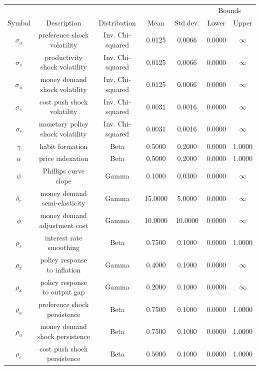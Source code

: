 \documentclass[11pt,preprint, authoryear]{elsarticle}
\let\origtable\table
\let\endorigtable\endtable
\renewenvironment{table}[1][2] {
    \expandafter\origtable\expandafter[H]
} {
    \endorigtable
}
\numberwithin{equation}{section}
\numberwithin{figure}{section}
\numberwithin{table}{section}
\begin{document}
\begin{table}
\caption{Prior information (parameters)}
 \label{Table:Prior}
 \begin{center}
\begin{tabular}{ |c|c|c|c|c|c|c|} 
\hline
  &  &  & & & \multicolumn{2}{|c|}{Bounds} \\ 
  \cline{6-7}
  Symbol & Description & Distribution & Mean & Std.dev. & Lower & Upper \\ 
\hline
$ {\sigma_a} $ & preference shock volatility & Inv. Chi-squared & 0.0125  & 0.0066 & 0.0000 & $\infty$  \\ 
$ {\sigma_z} $ & productivity shock volatility & Inv. Chi-squared  & 0.0125 & 0.0066 & 0.0000 & $\infty$ \\ 
$ {\sigma_u} $ & money demand shock volatility & Inv. Chi-squared & 0.0125  & 0.0066 & 0.0000 & $\infty$  \\ 
$ {\sigma_e} $ & cost push shock volatility & Inv. Chi-squared & 0.0031 & 0.0016 & 0.0000 & $\infty$  \\ 
$ {\sigma_r} $ & monetary policy shock volatility & Inv. Chi-squared & 0.0031  & 0.0016 & 0.0000 & $\infty$  \\ 
$ {\gamma} $ & habit formation& Beta & 0.5000  & 0.2000 & 0.0000 & 1.0000 \\ 
$ {\alpha} $ & price indexation  & Beta & 0.5000 & 0.2000 & 0.0000 & 1.0000  \\ 
$ {\psi} $ & Phillips curve slope & Gamma & 0.1000 & 0.0300 & 0.0000 & $\infty$ \\ 
$ {\delta_r} $ & money demand semi-elasticity & Gamma & 15.0000  & 5.0000 & 0.0000 & $\infty$ \\ 
$ {\phi} $ & money demand adjustment cost & Gamma & 10.0000 & 10.0000 & 0.0000 & $\infty$  \\ 
$ {\rho_r} $ & interest rate smoothing & Beta & 0.7500 & 0.1000 & 0.0000 & 1.0000 \\ 
$ {\rho_\pi} $ & policy response to inflation & Gamma & 0.4000  & 0.1000 & 0.0000 & $\infty$  \\ 
$ {\rho_x} $ & policy response to output gap & Gamma & 0.2000 & 0.1000 & 0.0000 & $\infty$ \\ 
$ {\rho_a} $ & preference shock persistence  & Beta & 0.7500  & 0.1000 & 0.0000 & 1.0000  \\ 
$ {\rho_u} $ & money demand shock persistence & Beta & 0.7500  & 0.1000 & 0.0000 & 1.0000  \\ 
$ {\rho_e} $ & cost push shock persistence & Beta & 0.5000  & 0.1000 & 0.0000 & 1.0000  \\ 
\hline
\end{tabular}
\end{center}
\end{table}
\end{document}

